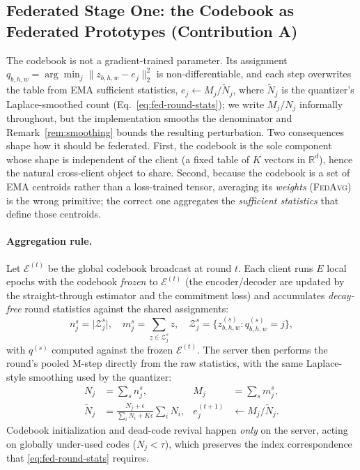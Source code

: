 \subsection{Federated Stage One: the Codebook as Federated Prototypes (Contribution A)}
\label{sec:fed-stage1}
The codebook is not a gradient-trained parameter. Its assignment
$q_{b,h,w}=\arg\min_j\|z_{b,h,w}-e_j\|_2^2$ is non-differentiable, and each step
overwrites the table from EMA sufficient statistics, $e_j\leftarrow M_j/\tilde{N}_j$, where
$\tilde{N}_j$ is the quantizer's Laplace-smoothed count (Eq.~\ref{eq:fed-round-stats}); we write
$M_j/N_j$ informally throughout, but the implementation smooths the denominator and
Remark~\ref{rem:smoothing} bounds the resulting perturbation. Two
consequences shape how it should be federated. First, the codebook is the sole component
whose shape is independent of the client (a fixed table of $K$ vectors in
$\mathbb{R}^{d}$), hence the natural cross-client object to share. Second, because the
codebook is a set of EMA centroids rather than a loss-trained tensor, averaging its
\emph{weights} (\textsc{FedAvg}) is the wrong primitive; the correct one aggregates the
\emph{sufficient statistics} that define those centroids.

\paragraph{Aggregation rule.} Let $\mathcal{E}^{(t)}$ be the global codebook broadcast at
round $t$. Each client runs $E$ local epochs with the codebook \emph{frozen} to
$\mathcal{E}^{(t)}$ (the encoder/decoder are updated by the straight-through estimator and
the commitment loss) and accumulates \emph{decay-free} round statistics against the shared
assignments:
\begin{equation}
  n^{s}_{j}=\big|\mathcal{Z}^{s}_{j}\big|,\quad
  m^{s}_{j}=\!\!\sum_{z\in\mathcal{Z}^{s}_{j}}\!\!z,\quad
  \mathcal{Z}^{s}_{j}=\{z^{(s)}_{b,h,w}:q^{(s)}_{b,h,w}=j\},
\end{equation}
with $q^{(s)}$ computed against the frozen $\mathcal{E}^{(t)}$. The server then performs
the round's pooled M-step directly from the raw statistics, with the same Laplace-style
smoothing used by the quantizer:
\begin{align}
  N_j &= \textstyle\sum_{s} n^{s}_{j}, &
  M_j &= \textstyle\sum_{s} m^{s}_{j},
  \label{eq:fed-round-stats}\\[2pt]
  \tilde N_j &= \tfrac{N_j+\epsilon}{\sum_i N_i+K\epsilon}\textstyle\sum_i N_i, &
  e^{(t+1)}_j &\leftarrow M_j/\tilde N_j .
  \label{eq:fed-centroid}
\end{align}
Codebook initialization and dead-code revival happen \emph{only} on the server, acting on
globally under-used codes ($N_j<\tau$), which preserves the index correspondence that
\eqref{eq:fed-round-stats} requires.

